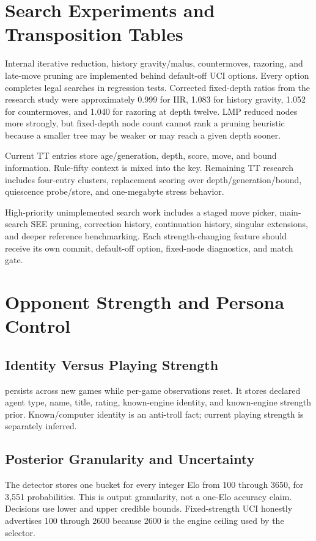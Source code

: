 \documentclass[conference]{IEEEtranSSP}
\newcommand{\code}[1]{\texttt{\detokenize{#1}}}
\begin{document}
\section{Search Experiments and Transposition Tables}
Internal iterative reduction, history gravity/malus, countermoves, razoring, and late-move pruning are implemented behind default-off UCI options. Every option completes legal searches in regression tests. Corrected fixed-depth ratios from the research study were approximately 0.999 for IIR, 1.083 for history gravity, 1.052 for countermoves, and 1.040 for razoring at depth twelve. LMP reduced nodes more strongly, but fixed-depth node count cannot rank a pruning heuristic because a smaller tree may be weaker or may reach a given depth sooner.

Current TT entries store age/generation, depth, score, move, and bound information. Rule-fifty context is mixed into the key. Remaining TT research includes four-entry clusters, replacement scoring over depth/generation/bound, quiescence probe/store, and one-megabyte stress behavior.

High-priority unimplemented search work includes a staged move picker, main-search SEE pruning, correction history, continuation history, singular extensions, and deeper reference benchmarking. Each strength-changing feature should receive its own commit, default-off option, fixed-node diagnostics, and match gate.

\section{Opponent Strength and Persona Control}
\subsection{Identity Versus Playing Strength}
\code{OpponentDescriptor} persists across new games while per-game observations reset. It stores declared agent type, name, title, rating, known-engine identity, and known-engine strength prior. Known/computer identity is an anti-troll fact; current playing strength is separately inferred.

\subsection{Posterior Granularity and Uncertainty}
The detector stores one bucket for every integer Elo from 100 through 3650, for 3,551 probabilities. This is output granularity, not a one-Elo accuracy claim. Decisions use lower and upper credible bounds. Fixed-strength UCI honestly advertises 100 through 2600 because 2600 is the engine ceiling used by the selector.
\end{document}
